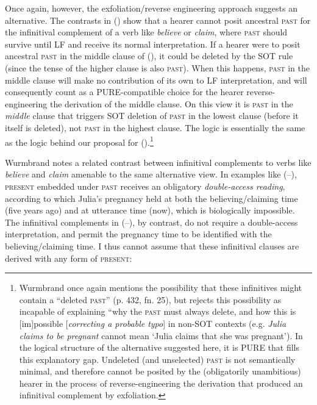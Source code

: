 \documentclass[output=paper]{langscibook}
\begin{document}
Once again, however, the exfoliation/reverse engineering approach suggests an alternative. The contrasts in () show that a hearer cannot posit ancestral \textsc{past} for the infinitival complement of a verb like \textit{believe} or \textit{claim}, where \textsc{past} should survive until LF and receive its normal interpretation. If a hearer were to posit ancestral \textsc{past} in the middle clause of (), it could be deleted by the SOT rule (since the tense of the higher clause is also \textsc{past}). When this happens, \textsc{past} in the middle clause will make no contribution of its own to LF interpretation, and will consequently count as a PURE-compatible choice for the hearer reverse-engineering the derivation of the middle clause. On this view it is \textsc{past} in the\textit{ middle} clause that triggers SOT deletion of \textsc{past} in the lowest clause (before it itself is deleted), not \textsc{past} in the highest clause. The logic is essentially the same as the logic behind our proposal for ().\footnote{Wurmbrand once again mentions the possibility that these infinitives might contain a “deleted \textsc{past}” (p. 432, fn. 25), but rejects this possibility as incapable of explaining “why the \textsc{past} must always delete, and how this is {[}im{]}possible {[}\textit{correcting a probable typo}{]} in non-SOT contexts (e.g. \textit{Julia claims to be pregnant} cannot mean `Julia claims that she was pregnant'). In the logical structure of the alternative suggested here, it is PURE that fills this explanatory gap. Undeleted (and unselected) \textsc{past} is not semantically minimal, and therefore cannot be posited by the (obligatorily unambitious) hearer in the process of reverse-engineering the derivation that produced an infinitival complement by exfoliation.} 

Wurmbrand notes a related contrast between infinitival complements to verbs like \textit{believe} and \textit{claim} amenable to the same alternative view. In examples like (--), \textsc{present} embedded under \textsc{past} receives an obligatory \textit{double-access reading}, according to which Julia's pregnancy held at both the believing/claiming time (five years ago) and at utterance time (now), which is biologically impossible. The infinitival complements in (--), by contrast, do not require a double-access interpretation, and permit the pregnancy time to be identified with the believing/claiming time. I thus cannot assume that these infinitival clauses are derived with any form of \textsc{present}:
\end{document}
